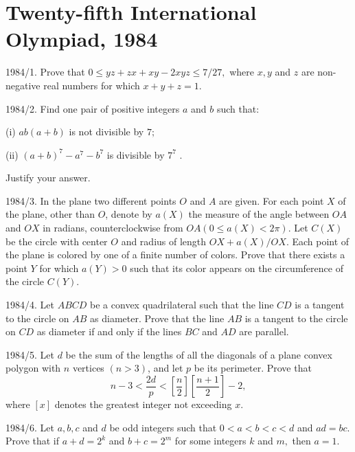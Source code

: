\documentclass[12pt,thmsa]{article}
\begin{document}
\section{Twenty-fifth International Olympiad, 1984}

1984/1. Prove that $0\le yz+zx+xy-2xyz\le 7/27,$ where $x,y$ and $z$ are
non-negative real numbers for which $x+y+z=1.$

1984/2. Find one pair of positive integers $a$ and $b$ such that:

(i) $ab(a+b)$ is not divisible by $7;$

(ii) $(a+b)^{7}-a^{7}-b^{7}$ is divisible by $7^{7}$ .

Justify your answer.

1984/3. In the plane two different points $O$ and $A$ are given. For each
point $X$ of the plane, other than $O$, denote by $a(X)$ the measure of the
angle between $OA$ and $OX$ in radians, counterclockwise from $OA(0\le
a(X)<2\pi ).$ Let $C(X)$ be the circle with center $O$ and radius of length $%
OX+a(X)/OX.$ Each point of the plane is colored by one of a finite number of
colors. Prove that there exists a point $Y$ for which $a(Y)>0$ such that its
color appears on the circumference of the circle $C(Y).$

1984/4. Let $ABCD$ be a convex quadrilateral such that the line $CD$ is a
tangent to the circle on $AB$ as diameter. Prove that the line $AB$ is a
tangent to the circle on $CD$ as diameter if and only if the lines $BC$ and $%
AD$ are parallel.

1984/5. Let $d$ be the sum of the lengths of all the diagonals of a plane
convex polygon with $n$ vertices $(n>3)$, and let $p$ be its perimeter.
Prove that 
\[
n-3<\frac{2d}{p}<\left[ \frac{n}{2}\right] \left[ \frac{n+1}{2}\right] -2, 
\]
where $[x]$ denotes the greatest integer not exceeding $x.$

1984/6. Let $a,b,c$ and $d$ be odd integers such that $0<a<b<c<d$ and $ad=bc.
$ Prove that if $a+d=2^{k}$ and $b+c=2^{m}$ for some integers $k$ and $m,$
then $a=1.$
\end{document}
